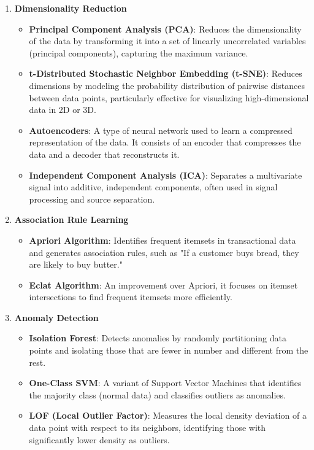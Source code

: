 \begin{enumerate}
    \item \textbf{Dimensionality Reduction}
    \begin{itemize}
        \item \textbf{Principal Component Analysis (PCA)}: Reduces the dimensionality of the data by transforming it into a set of linearly uncorrelated variables (principal components), capturing the maximum variance.
        \item \textbf{t-Distributed Stochastic Neighbor Embedding (t-SNE)}: Reduces dimensions by modeling the probability distribution of pairwise distances between data points, particularly effective for visualizing high-dimensional data in 2D or 3D.
        \item \textbf{Autoencoders}: A type of neural network used to learn a compressed representation of the data. It consists of an encoder that compresses the data and a decoder that reconstructs it.
        \item \textbf{Independent Component Analysis (ICA)}: Separates a multivariate signal into additive, independent components, often used in signal processing and source separation.
    \end{itemize}

    \item \textbf{Association Rule Learning}
    \begin{itemize}
        \item \textbf{Apriori Algorithm}: Identifies frequent itemsets in transactional data and generates association rules, such as "If a customer buys bread, they are likely to buy butter."
        \item \textbf{Eclat Algorithm}: An improvement over Apriori, it focuses on itemset intersections to find frequent itemsets more efficiently.
    \end{itemize}

    \item \textbf{Anomaly Detection}
    \begin{itemize}
        \item \textbf{Isolation Forest}: Detects anomalies by randomly partitioning data points and isolating those that are fewer in number and different from the rest.
        \item \textbf{One-Class SVM}: A variant of Support Vector Machines that identifies the majority class (normal data) and classifies outliers as anomalies.
        \item \textbf{LOF (Local Outlier Factor)}: Measures the local density deviation of a data point with respect to its neighbors, identifying those with significantly lower density as outliers.
    \end{itemize}


\end{enumerate}
